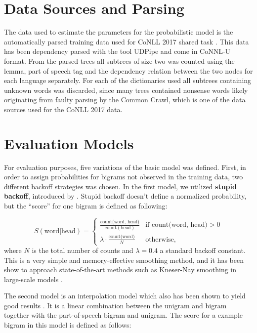 \section{Data Sources and Parsing}
The data used to estimate the parameters for the probabilistic model is the automatically parsed training data used for CoNLL 2017 shared task \citep{ginter2017conll}. This data has been dependency parsed with the tool UDPipe and come in CoNNL-U format. From the parsed trees all subtrees of size two was counted using the lemma, part of speech tag and the dependency relation between the two nodes for each language separately. For each of the dictionaries used all subtrees containing unknown words was discarded, since many trees contained nonsense words likely originating from faulty parsing by the Common Crawl, which is one of the data sources used for the CoNLL 2017 data.

\section{Evaluation Models}
\label{sec:models}

For evaluation purposes, five variations of the basic model was defined. First, in order to assign probabilities for bigrams not observed in the training data, two different backoff strategies was chosen. In the first model, we utilized \textbf{stupid backoff}, introduced by \citet{brants2007large}. Stupid backoff doesn't define a normalized probability, but the ``score'' for one bigram is defined as following:

\begin{equation*}
S(\text{word} | \text{head}) = \begin{cases}
\frac{\text{count(word, head})}{\text{count}(\text{head})} & \text{if count(word, head)} > 0\\[.5em]
\lambda \cdot \frac{\text{count(word)}}{N} & \text{otherwise},
\end{cases}
\end{equation*}
where $N$ is the total number of counts and $\lambda=0.4$ a standard backoff constant. This is a very simple and memory-effective smoothing method, and it has been show to approach state-of-the-art methods such as Kneser-Nay smoothing in large-scale models \citep{brants2007large}.

The second model is an interpolation model which also has been shown to yield good results \citep{chen1996empirical}. It is a linear combination between the unigram and bigram together with the part-of-speech bigram and unigram. The score for a example bigram in this model is defined as follows:

